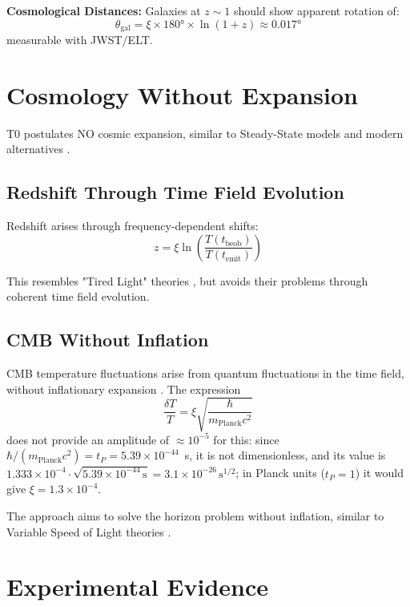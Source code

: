 	\textbf{Cosmological Distances:}
	Galaxies at $z \sim 1$ should show apparent rotation of:
	\begin{equation}
		\theta_{\text{gal}} = \xi \times 180° \times \ln(1+z) \approx 0.017°
	\end{equation}
	measurable with JWST/ELT.
	\section{Cosmology Without Expansion}
	
	T0 postulates NO cosmic expansion, similar to Steady-State models \cite{hoyle1948, bondi1948} and modern alternatives \cite{lopez2010, lerner2014}.
	
	\subsection{Redshift Through Time Field Evolution}
	
	Redshift arises through frequency-dependent shifts:
	\begin{equation}
		z = \xi \ln\left(\frac{T(t_{\text{beob}})}{T(t_{\text{emit}})}\right)
	\end{equation}
	
	This resembles "Tired Light" theories \cite{zwicky1929}, but avoids their problems through coherent time field evolution.
	
	\subsection{CMB Without Inflation}
	
	CMB temperature fluctuations arise from quantum fluctuations in the time field, without inflationary expansion \cite{pascher2025cmb}. The expression
	\begin{equation}
		\frac{\delta T}{T} = \xi \sqrt{\frac{\hbar}{m_{\text{Planck}}c^2}}
	\end{equation}
	does not provide an amplitude of $\approx 10^{-5}$ for this: since $\hbar/(m_{\text{Planck}}c^2) = t_P = 5.39\times10^{-44}$~s, it is not dimensionless, and its value is $1.333\times10^{-4}\cdot\sqrt{5.39\times10^{-44}\,\mathrm{s}} = 3.1\times10^{-26}\,\mathrm{s}^{1/2}$; in Planck units ($t_P = 1$) it would give $\xi = 1.3\times10^{-4}$.
	
	The approach aims to solve the horizon problem without inflation, similar to Variable Speed of Light theories \cite{albrecht1999, barrow1999}.
	
	\section{Experimental Evidence}
	
